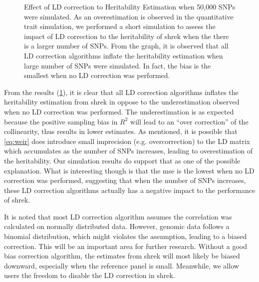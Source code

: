 \begin{figure}[t]
{			\label{fig:bigvarLDCor}
		}
		\caption[Effect of LD correction to Heritability Estimation with 50,000 SNPs]
		{Effect of LD correction to Heritability Estimation when 50,000 \glspl{SNP} were simulated.
			As an overestimation is observed in the quantitative trait simulation, we performed a short simulation to assess the impact of \gls{LD} correction to the heritability of \gls{shrek} when the there is a larger number of \glspl{SNP}.
			From the graph, it is observed that all \gls{LD} correction algorithms inflate the heritability estimation when large number of \glspl{SNP} were simulated.
			In fact, the bias is the smallest when no \gls{LD} correction was performed. 
		} 
		\label{fig:ldCorBigCom}
	\end{figure}
	
	From the results (\cref{fig:ldCorBigCom}), it is clear that all \gls{LD} correction algorithms inflates the heritability estimation from \gls{shrek} in oppose to the underestimation observed when no \gls{LD} correction was performed.
	The underestimation is as expected because the positive sampling bias in $R^2$ will lead to an ``over correction'' of the collinearity, thus results in lower estimates.
	As mentioned, it is possible that \cref{eq:weir} does introduce small imprecision (e.g. overcorrection) to the \gls{LD} matrix which accumulates as the number of \glspl{SNP} increases, leading to overestimation of the heritability.
	Our simulation results do support that as one of the possible explanation. 
	What is interesting though is that the \gls{mse} is the lowest when no \gls{LD} correction was performed, suggesting that when the number of \glspl{SNP} increases, these \gls{LD} correction algorithms actually has a negative impact to the performance of \gls{shrek}.
	
	It is noted that most \gls{LD} correction algorithm assumes the correlation was calculated on normally distributed data. 
	However, genomic data follows a binomial distribution, which might violates the assumption,  leading to a biased correction.
	This will be an important area for further research.
	Without a good bias correction algorithm, the estimates from \gls{shrek} will most likely be biased downward, especially when the reference panel is small.
	Meanwhile, we allow users the freedom to disable the \gls{LD} correction in \gls{shrek}.
	
